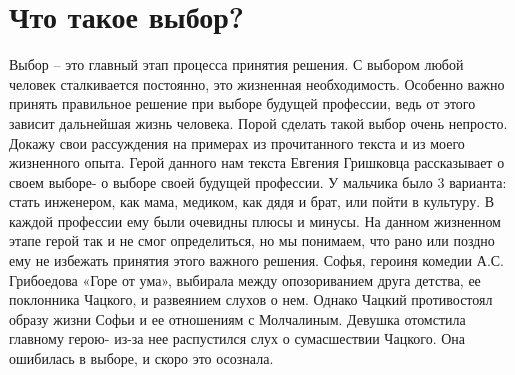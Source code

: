 \documentclass[12pt, letterpaper]{article}
\begin{document}
\section{Что такое выбор?}
Выбор – это главный этап процесса принятия решения. С выбором любой человек сталкивается постоянно, это жизненная необходимость. Особенно важно принять правильное решение при выборе будущей профессии, ведь от этого зависит дальнейшая жизнь человека. Порой сделать такой выбор очень непросто. Докажу свои рассуждения на примерах из прочитанного текста и из моего жизненного опыта.
Герой данного нам текста Евгения Гришковца рассказывает о своем выборе- о выборе своей будущей профессии. У мальчика было 3 варианта: стать инженером, как мама, медиком, как дядя и брат, или пойти в культуру. В каждой профессии ему были очевидны плюсы и минусы. На данном жизненном этапе герой так и не смог определиться, но мы понимаем, что рано или поздно ему не избежать принятия этого важного решения. 
Софья, героиня комедии А.С. Грибоедова «Горе от ума», выбирала между опозориванием друга детства, ее поклонника Чацкого,  и развеянием слухов о нем. Однако Чацкий противостоял образу жизни Софьи и ее отношениям с Молчалиным. Девушка отомстила главному герою- из-за нее распустился слух о сумасшествии Чацкого. Она ошибилась в выборе, и скоро это осознала.
\end{document}
